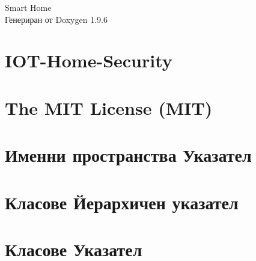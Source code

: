 \documentclass[twoside]{book}
\newcommand{\+}{\discretionary{\mbox{\scriptsize$\hookleftarrow$}}{}{}}
\newcommand{\clearemptydoublepage}{%
    \newpage{\pagestyle{empty}\cleardoublepage}%
  }
\begin{document}
  \raggedbottom
    \hypersetup{pageanchor=false,
                bookmarksnumbered=true,
                pdfencoding=unicode
               }
  \begin{titlepage}
  \vspace*{7cm}
  \begin{center}%
  {\Large Smart Home}\\
  \vspace*{1cm}
  {\large Генериран от Doxygen 1.9.6}\\
  \end{center}
  \end{titlepage}
  \clearemptydoublepage
  \tableofcontents
  \clearemptydoublepage
  \hypersetup{pageanchor=true}
\chapter{IOT-\/\+Home-\/\+Security}
\label{md_2223_otj_12_project_repo_csharp_kddinev18__r_e_a_d_m_e}

\chapter{The MIT License (MIT)}
\label{md_2223_otj_12_project_repo_csharp_kddinev18__web_app_wwwroot_lib_jquery_validation__l_i_c_e_n_s_e}

\chapter{Именни пространства Указател}

\chapter{Класове Йерархичен указател}

\chapter{Класове Указател}

\end{document}

